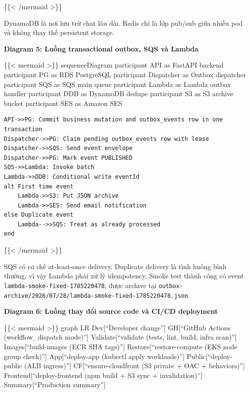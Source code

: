 \{\{\textless{} /mermaid \textgreater\}\}

DynamoDB là nơi lưu trữ chat lâu dài. Redis chỉ là lớp pub/sub giữa
nhiều pod và không thay thế persistent storage.

\vspace{0.5em}\noindent\textbf{Diagram 5: Luồng transactional outbox, SQS và
Lambda}\par

\{\{\textless{} mermaid \textgreater\}\} sequenceDiagram participant API
as FastAPI backend participant PG as RDS PostgreSQL participant
Dispatcher as Outbox dispatcher participant SQS as SQS main queue
participant Lambda as Lambda outbox handler participant DDB as DynamoDB
dedupe participant S3 as S3 archive bucket participant SES as Amazon SES

\begin{verbatim}
API->>PG: Commit business mutation and outbox_events row in one transaction
Dispatcher->>PG: Claim pending outbox_events row with lease
Dispatcher->>SQS: Send event envelope
Dispatcher->>PG: Mark event PUBLISHED
SQS->>Lambda: Invoke batch
Lambda->>DDB: Conditional write eventId
alt First time event
    Lambda->>S3: Put JSON archive
    Lambda->>SES: Send email notification
else Duplicate event
    Lambda-->>SQS: Treat as already processed
end
\end{verbatim}

\{\{\textless{} /mermaid \textgreater\}\}

SQS có cơ chế at-least-once delivery. Duplicate delivery là tình huống
bình thường, vì vậy Lambda phải xử lý idempotency. Smoke test thành công
có event \texttt{lambda-\allowbreak{}smoke-\allowbreak{}fixed-\allowbreak{}1785220478}, được archive tại
\texttt{outbox-\allowbreak{}archive/\allowbreak{}2026/\allowbreak{}07/\allowbreak{}28/\allowbreak{}lambda-\allowbreak{}smoke-\allowbreak{}fixed-\allowbreak{}1785220478.\allowbreak{}json}.

\vspace{0.5em}\noindent\textbf{Diagram 6: Luồng thay đổi source code và CI/CD
deployment}\par

\{\{\textless{} mermaid \textgreater\}\} graph LR Dev{[}``Developer
change''{]} GH{[}``GitHub Actions (workflow\_dispatch mode)''{]}
Validate{[}``validate (tests, lint, build, infra scan)''{]}
Images{[}``build-images (ECR SHA tags)''{]} Restore{[}``restore-compute
(EKS node group check)''{]} App{[}``deploy-app (kubectl apply
workloads)''{]} Public{[}``deploy-public (ALB ingress)''{]}
CF{[}``ensure-cloudfront (S3 private + OAC + behaviors)''{]}
Frontend{[}``deploy-frontend (npm build + S3 sync + invalidation)''{]}
Summary{[}``Production summary''{]}

